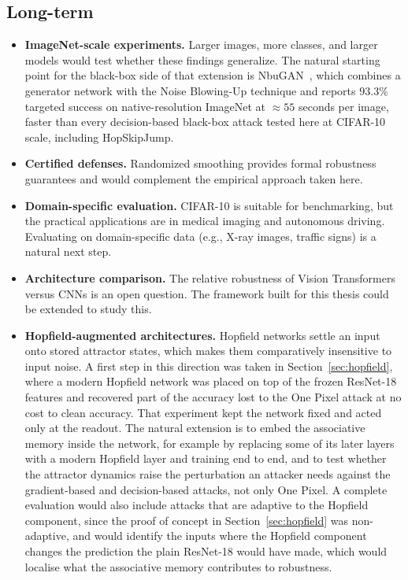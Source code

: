 \subsection{Long-term}

\begin{itemize}
    \item \textbf{ImageNet-scale experiments.} Larger images, more classes, and larger models would test whether these findings generalize. The natural starting point for the black-box side of that extension is NbuGAN~\cite{topal2026nbugan}, which combines a generator network with the Noise Blowing-Up technique and reports $93.3\%$ targeted success on native-resolution ImageNet at $\approx 55$ seconds per image, faster than every decision-based black-box attack tested here at CIFAR-10 scale, including HopSkipJump.

    \item \textbf{Certified defenses.} Randomized smoothing provides formal robustness guarantees and would complement the empirical approach taken here.

    \item \textbf{Domain-specific evaluation.} CIFAR-10 is suitable for benchmarking, but the practical applications are in medical imaging and autonomous driving. Evaluating on domain-specific data (e.g., X-ray images, traffic signs) is a natural next step.

    \item \textbf{Architecture comparison.} The relative robustness of Vision Transformers versus CNNs is an open question. The framework built for this thesis could be extended to study this.

    \item \textbf{Hopfield-augmented architectures.} Hopfield networks settle an input onto stored attractor states, which makes them comparatively insensitive to input noise. A first step in this direction was taken in Section~\ref{sec:hopfield}, where a modern Hopfield network was placed on top of the frozen ResNet-18 features and recovered part of the accuracy lost to the One Pixel attack at no cost to clean accuracy. That experiment kept the network fixed and acted only at the readout. The natural extension is to embed the associative memory inside the network, for example by replacing some of its later layers with a modern Hopfield layer and training end to end, and to test whether the attractor dynamics raise the perturbation an attacker needs against the gradient-based and decision-based attacks, not only One Pixel. A complete evaluation would also include attacks that are adaptive to the Hopfield component, since the proof of concept in Section~\ref{sec:hopfield} was non-adaptive, and would identify the inputs where the Hopfield component changes the prediction the plain ResNet-18 would have made, which would localise what the associative memory contributes to robustness.


\end{itemize}
